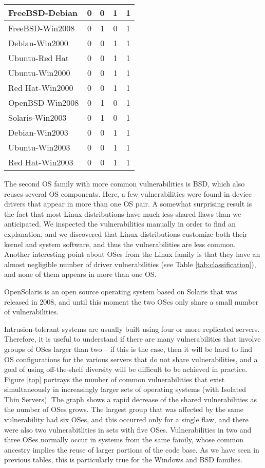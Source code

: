 \begin{table}[!ht]
\begin{center}
{\begin{tabular}{|l||c|c|c||c|}
FreeBSD-Debian &  0 & 0 & 1 & 1 \\\hline
FreeBSD-Win2008 &  0 & 1 & 0 & 1  \\\hline
Debian-Win2000 &  0 & 0 & 1 & 1  \\\hline
Ubuntu-Red Hat &  0 & 0 & 1 & 1  \\\hline
Ubuntu-Win2000 &  0 & 0 & 1 & 1  \\\hline
Red Hat-Win2000 &  0 & 0 & 1 & 1  \\\hline
OpenBSD-Win2008 &  0 & 1 & 0 & 1  \\\hline
Solaris-Win2003 &  0 & 1 & 0 & 1  \\\hline
Debian-Win2003 &  0 & 0 & 1 & 1  \\\hline
Ubuntu-Win2003 &  0 & 0 & 1 & 1  \\\hline
Red Hat-Win2003 &  0 & 0 & 1 & 1  \\\hline
\end{tabular}
}
\end{center}
\end{table}

The second OS family with more common vulnerabilities is BSD, which also reuses several OS components. Here, a few vulnerabilities were found in device drivers that appear in more than one OS pair. A somewhat surprising result is the fact that most Linux distributions have much less shared flaws than we anticipated. We inspected the vulnerabilities manually in order to find an explanation, and we discovered that Linux distributions customize both their kernel and system software, and thus the vulnerabilities are less common. Another interesting point about OSes from the Linux family is that they have an almost negligible number of driver vulnerabilities (see Table \ref{tab:classification}), and none of them appears in more than one OS.


OpenSolaris is an open source operating system based on Solaris that was released in 2008, and until this moment the two OSes only share a small number of vulnerabilities.


Intrusion-tolerant systems are usually built using four or more replicated servers. Therefore, it is useful to understand if there are many vulnerabilities that involve groups of OSes larger than two -- if this is the case, then it will be hard to find OS configurations for the various servers that do not share vulnerabilities, and a goal of using off-the-shelf diversity will be difficult to be achieved in practice. Figure \ref{top} portrays the number of common vulnerabilities that exist simultaneously in increasingly larger sets of operating systems (with Isolated Thin Servers). The graph shows a rapid decrease of the shared vulnerabilities as the number of OSes grows. The largest group that was affected by the same vulnerability had six OSes, and this occurred only for a single flaw, and there were also two vulnerabitlities in sets with five OSes. Vulnerabilities in two and three OSes normally occur in systems from the same family, whose common ancestry implies the reuse of larger portions of the code base. As we have seen in previous tables, this is particularly true for the Windows and BSD families.

